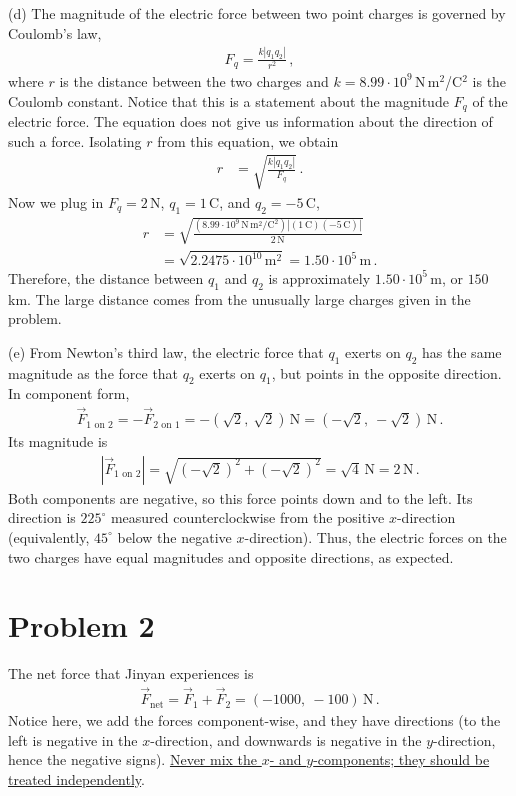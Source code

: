 \documentclass[11pt]{article}
\begin{document}
\noindent (d) The magnitude of the electric force between two point charges is governed by Coulomb's law,
\begin{align*}
F_q = \frac{k|q_1q_2|}{r^2}\,,
\end{align*}
where $r$ is the distance between the two charges and $k=8.99\cdot 10^9$\,N\,m$^2$/C$^2$ is the Coulomb constant. Notice that this is a statement about the magnitude $F_q$ of the electric force. The equation does not give us information about the direction of such a force. Isolating $r$ from this equation, we obtain
\begin{align*}
r &= \sqrt{\frac{k|q_1q_2|}{F_q}}\,.
\end{align*}
Now we plug in $F_q=2$\,N, $q_1=1$\,C, and $q_2=-5$\,C,
\begin{align*}
r &= \sqrt{\frac{(8.99\cdot 10^9\,\text{N}\,\text{m}^2/\text{C}^2)|(1\,\text{C})(-5\,\text{C})|}{2\,\text{N}}}\\
&=\sqrt{2.2475\cdot 10^{10}\,\text{m}^2}
=1.50\cdot 10^5\,\text{m}\,.
\end{align*}
Therefore, the distance between $q_1$ and $q_2$ is approximately $1.50\cdot 10^5$\,m, or $150$\,km. The large distance comes from the unusually large charges given in the problem.\vspace{0.2cm}

\noindent (e) From Newton's third law, the electric force that $q_1$ exerts on $q_2$ has the same magnitude as the force that $q_2$ exerts on $q_1$, but points in the opposite direction. In component form,
\begin{align*}
\vec{F}_{1\text{ on }2} = -\vec{F}_{2\text{ on }1}
=-(\sqrt{2},\ \sqrt{2})\,\text{N}
=(-\sqrt{2},\ -\sqrt{2})\,\text{N}\,.
\end{align*}
Its magnitude is
\begin{align*}
|\vec{F}_{1\text{ on }2}| = \sqrt{(-\sqrt{2})^2+(-\sqrt{2})^2}
=\sqrt{4}\,\text{N}=2\,\text{N}\,.
\end{align*}
Both components are negative, so this force points down and to the left. Its direction is $225^\circ$ measured counterclockwise from the positive $x$-direction (equivalently, $45^\circ$ below the negative $x$-direction). Thus, the electric forces on the two charges have equal magnitudes and opposite directions, as expected.

\section*{Problem 2}
The net force that Jinyan experiences is 
\begin{align*}
\vec{F}_{\text{net}} = \vec{F}_1 + \vec{F}_2 = (-1000,\ -100) \,\text{N}\,.
\end{align*}
Notice here, we add the forces component-wise, and they have directions (to the left is negative in the $x$-direction, and downwards is negative in the $y$-direction, hence the negative signs). \underline{Never mix the $x$- and $y$-components; they should be treated independently}.\\
\end{document}
